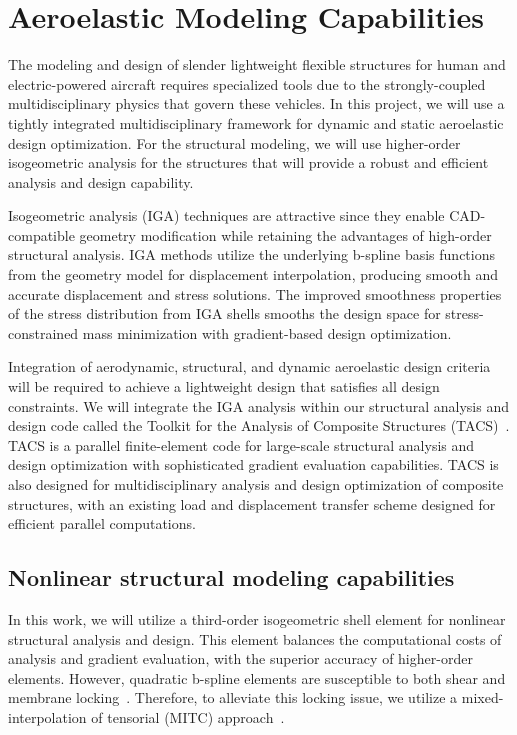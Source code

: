 \documentclass[12pt,headinclude,headsepline]{article}
\begin{document}
\section{Aeroelastic Modeling Capabilities}

The modeling and design of slender lightweight flexible structures for
human and electric-powered aircraft requires specialized tools due to
the strongly-coupled multidisciplinary physics that govern these
vehicles. In this project, we will use a tightly integrated
multidisciplinary framework for dynamic and static aeroelastic design
optimization.  For the structural modeling, we will use higher-order
isogeometric analysis for the structures that will provide a robust and
efficient analysis and design capability.

Isogeometric analysis (IGA) techniques are attractive since they
enable CAD-compatible geometry modification while retaining the
advantages of high-order structural analysis. IGA methods utilize the
underlying b-spline basis functions from the geometry model for
displacement interpolation, producing smooth and accurate displacement
and stress solutions. The improved smoothness properties of the stress
distribution from IGA shells smooths the design space for
stress-constrained mass minimization with gradient-based design
optimization.

Integration of aerodynamic, structural, and dynamic aeroelastic design
criteria will be required to achieve a lightweight design that
satisfies all design constraints. We will integrate the IGA analysis
within our structural analysis and design code called the Toolkit for
the Analysis of Composite Structures
(TACS)~\citep{Kennedy:2014:TACS}. TACS is a parallel finite-element
code for large-scale structural analysis and design optimization with
sophisticated gradient evaluation capabilities. TACS is also designed
for multidisciplinary analysis and design optimization of composite
structures, with an existing load and displacement transfer scheme
designed for efficient parallel computations.

\subsection{Nonlinear structural modeling capabilities}

In this work, we will utilize a third-order isogeometric shell element
for nonlinear structural analysis and design.  This element balances
the computational costs of analysis and gradient evaluation, with the
superior accuracy of higher-order elements. However, quadratic
b-spline elements are susceptible to both shear and membrane
locking~\citep{Babuska:1992:OLR, Chapelle.Bathe}. Therefore, to
alleviate this locking issue, we utilize a mixed-interpolation of
tensorial (MITC) approach~\citep{Dvorkin:1984:CMB, Bucalem:1993:HOM}.
\end{document}
